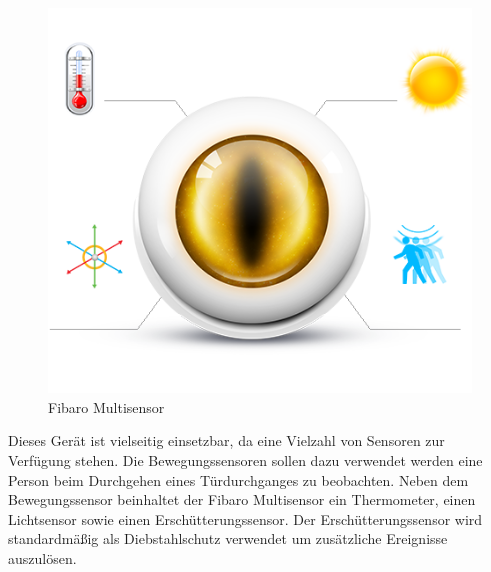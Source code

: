\begin{figure}[h!]
	\centering
	\includegraphics[scale=0.4]{img/Sensorevaluation/FibaroMulti.png}
	\caption{Fibaro Multisensor}
	\label{fig:sensorenFibaroMulti}
\end{figure}

Dieses Gerät ist vielseitig einsetzbar, da eine Vielzahl von Sensoren zur Verfügung stehen. Die Bewegungssensoren sollen dazu verwendet werden eine Person beim Durchgehen eines Türdurchganges zu beobachten.
Neben dem Bewegungssensor beinhaltet der Fibaro Multisensor ein Thermometer, einen Lichtsensor sowie einen Erschütterungssensor.
Der Erschütterungssensor wird standardmäßig als Diebstahlschutz verwendet um zusätzliche Ereignisse auszulösen.

\newpage

